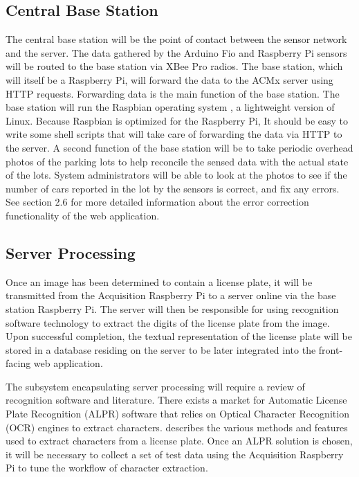 \documentclass[11pt, oneside, fullpage, doublespace]{article}
\begin{document}
\subsection{Central Base Station}
The central base station will be the point of contact between the sensor network and the server. The data gathered by the Arduino Fio and Raspberry Pi sensors will be routed to the base station via XBee Pro radios. The base station, which will itself be a Raspberry Pi, will forward the data to the ACMx server using HTTP requests. Forwarding data is the main function of the base station. The base station will run the Raspbian operating system \cite{raspbian}, a lightweight version of Linux. Because Raspbian is optimized for the Raspberry Pi, It should be easy to write some shell scripts that will take care of forwarding the data via HTTP to the server. A second function of the base station will be to take periodic overhead photos of the parking lots to help reconcile the sensed data with the actual state of the lots. System administrators will be able to look at the photos to see if the number of cars reported in the lot by the sensors is correct, and fix any errors. See section 2.6 for more detailed information about the error correction functionality of the web application.


\subsection{Server Processing}
Once an image has been determined to contain a license plate, it will be transmitted from the Acquisition Raspberry Pi to a server online via the base station Raspberry Pi. The server will then be responsible for using recognition software technology to extract the digits of the license plate from the image. Upon successful completion, the textual representation of the license plate will be stored in a database residing on the server to be later integrated into the front-facing web application.

The subsystem encapsulating server processing will require a review of recognition software and literature. There exists a market for Automatic License Plate Recognition (ALPR) software that relies on Optical Character Recognition (OCR) engines to extract characters. \cite{du2013} describes the various methods and features used to extract characters from a license plate. Once an ALPR solution is chosen, it will be necessary to collect a set of test data using the Acquisition Raspberry Pi to tune the workflow of character extraction.
\end{document}

